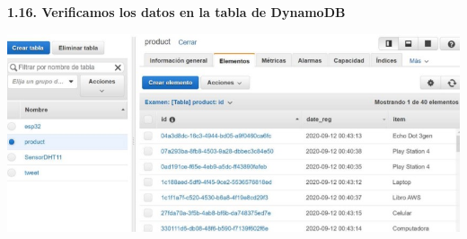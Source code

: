 \documentclass{article}
\begin{document}
	\textbf{1.16.  Verificamos los datos en la tabla de DynamoDB
}

    \begin{center}
		\includegraphics[width=15cm]{./images/17} 
	\end{center}
	
\end{document}
